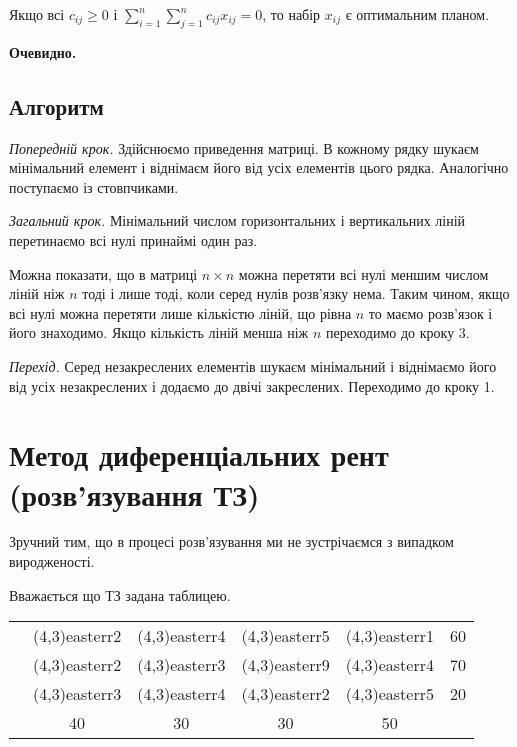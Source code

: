 \documentclass[12pt,a4paper]{book}
\newcommand{\diagcell}[4]{\diaghead({#1},{#2}){easterr}{#4}{#3}}
\newenvironment{slim_enumerate}{
\begin{enumerate}
  \setlength{\itemsep}{1pt}
  \setlength{\parskip}{0pt}
  \setlength{\parsep}{0pt}}
{\end{enumerate}}
\begin{document}
Якщо всі $c_{ij} \ge 0$ і $ \sum_{i=1}^n \sum_{j=1}^n c_{ij} x_{ij} = 0$, то набір $x_{ij}$ є оптимальним планом.

{\bf Очевидно.}

\subsection{Алгоритм}

\begin{slim_enumerate}
  \item {\it Попередній крок.} Здійснюємо приведення матриці. В кожному рядку шукаєм мінімальний елемент і віднімаєм його від усіх елементів цього рядка. Аналогічно поступаємо із стовпчиками.
  \item {\it Загальний крок.} Мінімальний числом горизонтальних і вертикальних ліній перетинаємо всі нулі принаймі один раз.

Можна показати, що в матриці $n \times n$ можна перетяти всі нулі меншим числом ліній ніж $n$ тоді і лише тоді, коли серед нулів розв’язку нема. Таким чином, якщо всі нулі можна перетяти лише кількістю ліній, що рівна $n$ то маємо розв’язок і його знаходимо. Якщо кількість ліній менша ніж $n$ переходимо до кроку 3.

  \item {\it Перехід.} Серед незакреслених елементів шукаєм мінімальний і віднімаємо його від усіх незакреслених і додаємо до двічі закреслених. Переходимо до кроку 1.
\end{slim_enumerate}

\section{Метод диференціальних рент (розв’язування ТЗ)}

Зручний тим, що в процесі розв’язування ми не зустрічаємся з випадком виродженості.

Вважається що ТЗ задана таблицею.\\
\begin{tabular}{ | c | c | c | c | c | c | }
\hline
	&		&		&		&		&\\
\hline
	&	\diagcell{4}{3}{}{2}	&	\diagcell{4}{3}{}{4}	&	\diagcell{4}{3}{}{5}	&	\diagcell{4}{3}{}{1}	&	60\\
\hline
	&	\diagcell{4}{3}{}{2}	&	\diagcell{4}{3}{}{3}	&	\diagcell{4}{3}{}{9}	&	\diagcell{4}{3}{}{4}	&	70\\
\hline
	&	\diagcell{4}{3}{}{3}	&	\diagcell{4}{3}{}{4}	&	\diagcell{4}{3}{}{2}	&	\diagcell{4}{3}{}{5}	&	20\\
\hline
	&	40	&	30	&	30	&	50	&\\
\hline
\end{tabular}
\end{document}
